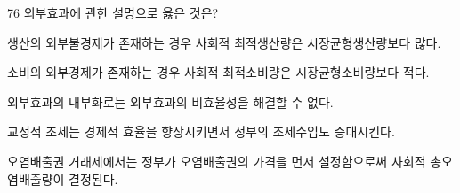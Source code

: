 \begin{question}{76}
외부효과에 관한 설명으로 옳은 것은?
\begin{choices}
  \item 생산의 외부불경제가 존재하는 경우 사회적 최적생산량은 시장균형생산량보다 많다.
  \item 소비의 외부경제가 존재하는 경우 사회적 최적소비량은 시장균형소비량보다 적다.
  \item 외부효과의 내부화로는 외부효과의 비효율성을 해결할 수 없다.
  \item 교정적 조세는 경제적 효율을 향상시키면서 정부의 조세수입도 증대시킨다.
  \item 오염배출권 거래제에서는 정부가 오염배출권의 가격을 먼저 설정함으로써 사회적 총오염배출량이 결정된다.
\end{choices}
\end{question}
